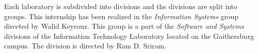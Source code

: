 Each laboratory is subdivided into divisions and the divisions are split into
groups. This internship has been realized in the \textit{Information Systems}
group directed by Walid Keyrouz. This group is a part of the \textit{Software
and Systems} divisions of the Information Technology Laboratory located on the
Gaithersburg campus. The division is directed by Ram D. Sriram.
